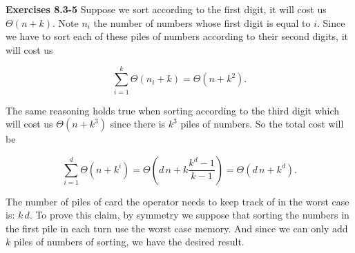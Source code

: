 \documentclass[a4paper,12pt]{article}
\newcommand{\newpar}[1]
{\bigskip \noindent \textbf{Exercises #1} \newline}
\begin{document}
\newpar{8.3-5} Suppose we sort according to the first digit, it will
cost us $\Theta(n + k)$.  Note $n_i$ the number of numbers whose first
digit is equal to $i$.  Since we have to sort each of these piles of
numbers according to their second digits, it will cost us

\[ \sum_{i=1}^k \Theta(n_i + k) = \Theta(n + k^2).\]

The same reasoning holds true when sorting according to the third
digit which will cost us $\Theta(n + k^3)$ since there is $k^3$ piles
of numbers.   So the total cost will be

\[ \sum_{i=1}^d \Theta(n+k^i) = \Theta\left(d\,n +
k\frac{k^d-1}{k-1}\right) = \Theta(d\,n + k^d).\]

The number of piles of card the operator needs to keep track of in the
worst case is: $k\,d$.  To prove this claim, by symmetry we suppose
that sorting the numbers in the first pile in each turn use the worst
case memory.  And since we can only add $k$ piles of numbers of
sorting, we have the desired result.
\end{document}
